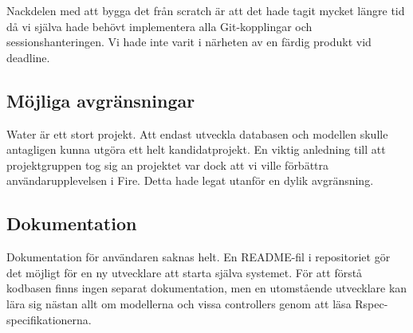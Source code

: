 Nackdelen med att bygga det från scratch är att det hade tagit mycket längre tid då vi själva hade behövt implementera alla Git-kopplingar och sessionshanteringen. Vi hade inte varit i närheten av en färdig produkt vid deadline.

\subsection{Möjliga avgränsningar}
Water är ett stort projekt. Att endast utveckla databasen och modellen skulle antagligen kunna utgöra ett helt kandidatprojekt. En viktig anledning till att projektgruppen tog sig an projektet var dock att vi ville förbättra användarupplevelsen i Fire. Detta hade legat utanför en dylik avgränsning.

\subsection{Dokumentation}
Dokumentation för användaren saknas helt. En README-fil i repositoriet gör det möjligt för en ny utvecklare att starta själva systemet. För att förstå kodbasen finns ingen separat dokumentation, men en utomstående utvecklare kan lära sig nästan allt om modellerna och vissa controllers genom att läsa Rspec-specifikationerna.
